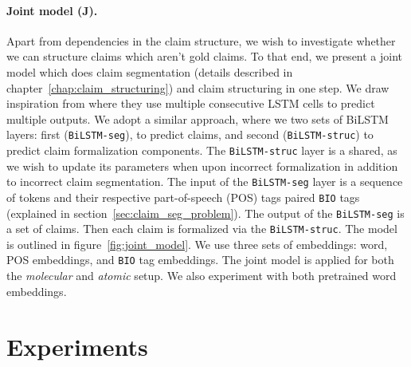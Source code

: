 \paragraph{Joint model (J). } 
Apart from dependencies in the claim structure, we wish to investigate whether
we can structure claims which aren't gold claims.  To that end, we present a
joint model which does claim segmentation (details described in
chapter~\ref{chap:claim_structuring}) and claim structuring in one step. We
draw inspiration from \citep{miwa2016end} where they use multiple consecutive
LSTM cells to predict multiple outputs.  We adopt a similar approach, where we
two sets of BiLSTM layers: first (\texttt{BiLSTM-seg}), to predict claims, and
second (\texttt{BiLSTM-struc}) to predict claim formalization components.  The
\texttt{BiLSTM-struc} layer is a shared, as we wish to update its parameters
when upon incorrect formalization in addition to incorrect claim segmentation.
The input of the \texttt{BiLSTM-seg} layer is a sequence of tokens and their
respective part-of-speech (POS) tags \citep{brown1957linguistic} paired \texttt{BIO}
tags (explained in section~\ref{sec:claim_seg_problem}). The output of the
\texttt{BiLSTM-seg} is a set of claims. Then each claim is formalized via the
\texttt{BiLSTM-struc}.  The model is outlined in figure~\ref{fig:joint_model}. 
We use three sets of embeddings: word, POS embeddings, and \texttt{BIO} tag
embeddings. The joint model is applied for both the \emph{molecular} and 
\emph{atomic} setup. 
We also experiment with both pretrained word embeddings. 

\section{Experiments}
\label{sec:claim_struc_experiment}

